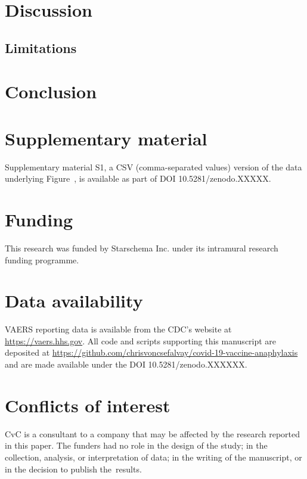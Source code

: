 \documentclass{article}
\begin{document}
\section{Discussion}

\subsection{Limitations}

\section{Conclusion}

\vspace{6pt}

\section*{Supplementary material}

Supplementary material S1, a CSV (comma-separated values) version of the data underlying Figure~, is available as part of DOI 10.5281/zenodo.XXXXX.

\section*{Funding}

This research was funded by Starschema Inc. under its intramural research funding programme.

\section*{Data availability}

VAERS reporting data is available from the CDC's website at \url{https://vaers.hhs.gov}.
All code and scripts supporting this manuscript are deposited at
\url{https://github.com/chrisvoncsefalvay/covid-19-vaccine-anaphylaxis} and are made available under the DOI 10.5281/zenodo.XXXXXX.

\section*{Conflicts of interest}

CvC is a consultant to a company that may be affected by the research reported in this paper.
The funders had no role in the design of the study;
in the collection, analysis, or interpretation of data;
in the writing of the manuscript, or in the decision to publish the~results.


\end{document}
